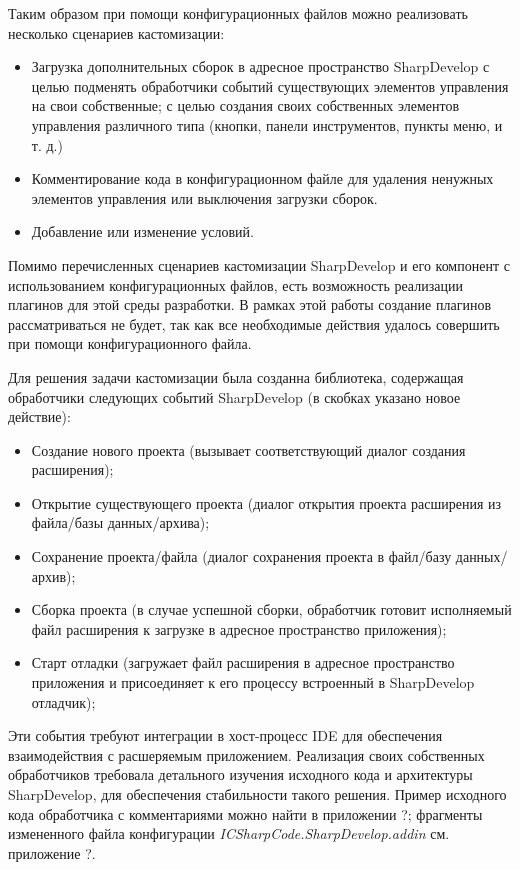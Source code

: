 Таким образом при помощи конфигурационных файлов можно реализовать несколько сценариев кастомизации:

\begin{itemize}
 \item Загрузка дополнительных сборок в адресное пространство SharpDevelop
  \subitem с целью подменять обработчики событий существующих элементов управления на свои собственные;
  \subitem с целью создания своих собственных элементов управления различного типа (кнопки, панели инструментов, пункты меню, и т. д.)
 \item Комментирование кода в конфигурационном файле для удаления ненужных элементов управления или выключения загрузки сборок.
 \item Добавление или изменение условий.
\end{itemize}
 
Помимо перечисленных сценариев кастомизации SharpDevelop и его компонент с использованием конфигурационных файлов, есть возможность реализации плагинов для этой среды разработки. В рамках этой работы создание плагинов рассматриваться не будет, так как все необходимые действия удалось совершить при помощи конфигурационного файла.
 
Для решения задачи кастомизации была созданна библиотека, содержащая обработчики следующих событий SharpDevelop (в скобках указано новое действие):

\begin{itemize}
 \item Создание нового проекта (вызывает соответствующий диалог создания расширения);
 \item Открытие существующего проекта (диалог открытия проекта расширения из файла/базы данных/архива);
 \item Сохранение проекта/файла (диалог сохранения проекта в файл/базу данных/архив);
 \item Сборка проекта (в случае успешной сборки, обработчик готовит исполняемый файл расширения к загрузке в адресное пространство приложения);
 \item Старт отладки (загружает файл расширения в адресное пространство приложения и присоединяет к его процессу встроенный в SharpDevelop отладчик);
\end{itemize}

Эти события требуют интеграции в хост-процесс IDE для обеспечения взаимодействия с расшеряемым приложением. Реализация своих собственных обработчиков требовала детального изучения исходного кода и архитектуры SharpDevelop, для обеспечения стабильности такого решения. Пример исходного кода обработчика с комментариями можно найти в приложении ?; фрагменты измененного файла конфигурации {\it ICSharpCode.SharpDevelop.addin} см. приложение ?.

